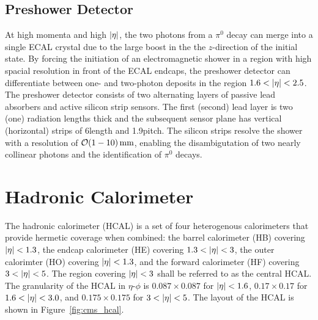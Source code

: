 \subsection{Preshower Detector}

At high momenta and high $\lvert \eta \rvert$, the two photons from a $\pi^0$ decay can merge into a single ECAL crystal due to the large boost in the the $z$-direction of the initial state.
By forcing the initiation of an electromagnetic shower in a region with high spacial resolution in front of the ECAL endcaps, the preshower detector can differentiate between one- and two-photon deposits in the region $1.6 < \lvert \eta \rvert < 2.5$.
The preshower detector consists of two alternating layers of passive lead absorbers and active silicon strip sensors.
The first (second) lead layer is two (one) radiation lengths thick and the subsequent sensor plane has vertical (horizontal) strips of 6\cm length and 1.9\mm pitch.
The silicon strips resolve the shower with a resolution of $\mathcal{O}(1-10)\,\text{mm}$, enabling the disambigutation of two nearly collinear photons and the identification of $\pi^0$ decays.

\section{Hadronic Calorimeter}

The hadronic calorimeter (HCAL) is a set of four heterogenous calorimeters that provide hermetic coverage when combined:  the barrel calorimeter (HB) covering $\lvert \eta \rvert< 1.3$, the endcap calorimeter (HE) covering $1.3 < \lvert \eta \rvert < 3$, the outer calorimter (HO) covering $\lvert \eta \rvert < 1.3$, and the forward calorimeter (HF) covering $3 < \lvert \eta \rvert < 5$.
The region covering $\lvert \eta \rvert < 3$ shall be referred to as the central HCAL.
The granularity of the HCAL in $\eta$-$\phi$ is $0.087\times0.087$ for $\lvert \eta \rvert<1.6$, $0.17\times0.17$ for $1.6 < \lvert \eta \rvert < 3.0$, and $0.175\times0.175$ for $3 < \lvert \eta \rvert < 5$.
The layout of the HCAL is shown in Figure~\ref{fig:cms_hcal}. 

